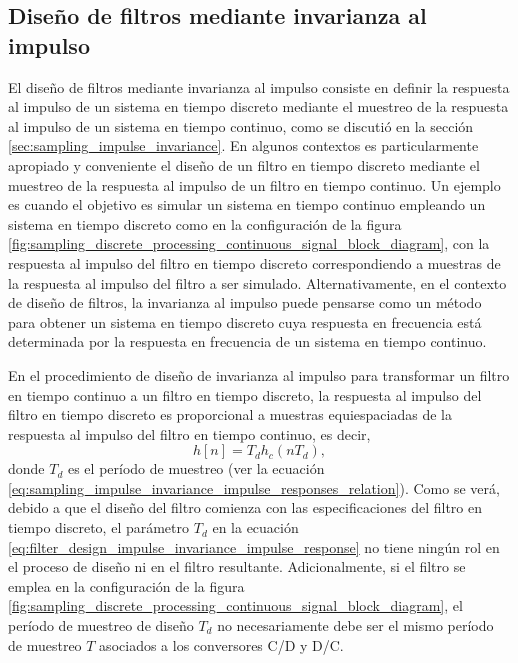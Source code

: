 \documentclass[a4paper]{report}
\begin{document}
\subsection{Diseño de filtros mediante invarianza al impulso}\label{sec:filter_design_impulse_invariance}

El diseño de filtros mediante invarianza al impulso consiste en definir la respuesta al impulso de un sistema en tiempo discreto mediante el muestreo de la respuesta al impulso de un sistema en tiempo continuo, como se discutió en la sección \ref{sec:sampling_impulse_invariance}. En algunos contextos es particularmente apropiado y conveniente el diseño de un filtro en tiempo discreto mediante el muestreo de la respuesta al impulso de un filtro en tiempo continuo. Un ejemplo es cuando el objetivo es simular un sistema en tiempo continuo empleando un sistema en tiempo discreto como en la configuración de la figura \ref{fig:sampling_discrete_processing_continuous_signal_block_diagram}, con la respuesta al impulso del filtro en tiempo discreto correspondiendo a muestras de la respuesta al impulso del filtro a ser simulado. Alternativamente, en el contexto de diseño de filtros, la invarianza al impulso puede pensarse como un método para obtener un sistema en tiempo discreto cuya respuesta en frecuencia está determinada por la respuesta en frecuencia de un sistema en tiempo continuo.

En el procedimiento de diseño de invarianza al impulso para transformar un filtro en tiempo continuo a un filtro en tiempo discreto, la respuesta al impulso del filtro en tiempo discreto es proporcional a muestras equiespaciadas de la respuesta al impulso del filtro en tiempo continuo, es decir,
\begin{equation}\label{eq:filter_design_impulse_invariance_impulse_response}
 h[n]=T_dh_c(nT_d), 
\end{equation}
donde \(T_d\) es el período de muestreo (ver la ecuación \ref{eq:sampling_impulse_invariance_impulse_responses_relation}). Como se verá, debido a que el diseño del filtro comienza con las especificaciones del filtro en tiempo discreto, el parámetro \(T_d\) en la ecuación \ref{eq:filter_design_impulse_invariance_impulse_response} no tiene ningún rol en el proceso de diseño ni en el filtro resultante. Adicionalmente, si el filtro se emplea en la configuración de la figura \ref{fig:sampling_discrete_processing_continuous_signal_block_diagram}, el período de muestreo de diseño \(T_d\) no necesariamente debe ser el mismo período de muestreo \(T\) asociados a los conversores C/D y D/C.
\end{document}
